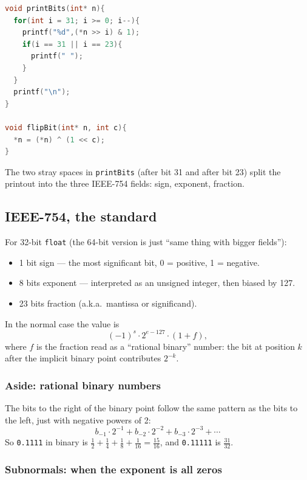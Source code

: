 \documentclass[11pt]{article}
\begin{document}
\begin{lstlisting}[language=C]
void printBits(int* n){
  for(int i = 31; i >= 0; i--){
    printf("%d",(*n >> i) & 1);
    if(i == 31 || i == 23){
      printf(" ");
    }
  }
  printf("\n");
}

void flipBit(int* n, int c){
  *n = (*n) ^ (1 << c);
}
\end{lstlisting}

The two stray spaces in \texttt{printBits} (after bit 31 and after
bit 23) split the printout into the three IEEE-754 fields: sign,
exponent, fraction.

\subsection*{IEEE-754, the standard}

For 32-bit \texttt{float} (the 64-bit version is just ``same thing
with bigger fields''):
\begin{itemize}
  \item 1 bit sign --- the most significant bit, 0 = positive, 1 =
    negative.
  \item 8 bits exponent --- interpreted as an unsigned integer, then
    biased by 127.
  \item 23 bits fraction (a.k.a.\ mantissa or significand).
\end{itemize}

In the normal case the value is
\[
  (-1)^s \cdot 2^{e - 127} \cdot (1 + f),
\]
where $f$ is the fraction read as a ``rational binary'' number: the
bit at position $k$ after the implicit binary point contributes
$2^{-k}$.

\subsubsection*{Aside: rational binary numbers}

The bits to the right of the binary point follow the same pattern as
the bits to the left, just with negative powers of 2:
\[
  b_{-1} \cdot 2^{-1} + b_{-2} \cdot 2^{-2} + b_{-3} \cdot 2^{-3} + \cdots
\]
So \texttt{0.1111} in binary is $\tfrac12 + \tfrac14 + \tfrac18 +
\tfrac{1}{16} = \tfrac{15}{16}$, and \texttt{0.11111} is
$\tfrac{31}{32}$.

\subsubsection*{Subnormals: when the exponent is all zeros}
\end{document}
